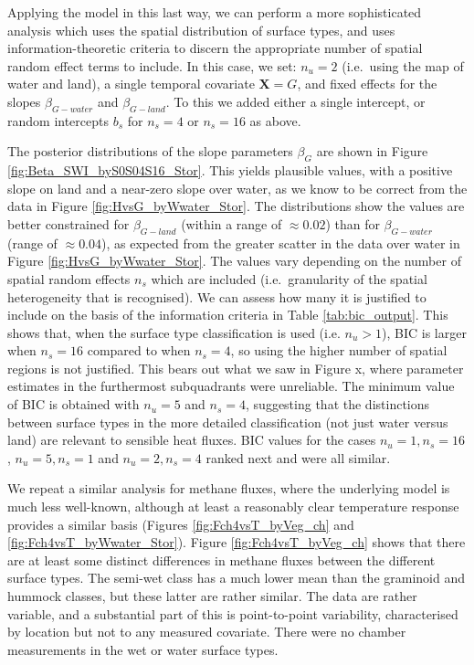 Applying the model in this last way, we can perform a more sophisticated
analysis which uses the spatial distribution of surface types, and uses
information-theoretic criteria to discern the appropriate number of
spatial random effect terms to include. In this case, we set:
\(n_u = 2\) (i.e.~using the map of water and land), a single temporal
covariate \(\mathbf{X} = G\), and fixed effects for the slopes
\(\beta_{G-water}\) and \(\beta_{G-land}\). To this we added either a
single intercept, or random intercepts \(b_s\) for \(n_s = 4\) or
\(n_s = 16\) as above.

The posterior distributions of the slope parameters \(\beta_{G}\) are
shown in Figure \ref{fig:Beta_SWI_byS0S04S16_Stor}. This yields
plausible values, with a positive slope on land and a near-zero slope
over water, as we know to be correct from the data in Figure
\ref{fig:HvsG_byWwater_Stor}. The distributions show the values are
better constrained for \(\beta_{G-land}\) (within a range of
\(\approx 0.02\)) than for \(\beta_{G-water}\) (range of
\(\approx 0.04\)), as expected from the greater scatter in the data over
water in Figure \ref{fig:HvsG_byWwater_Stor}. The values vary depending
on the number of spatial random effects \(n_s\) which are included
(i.e.~granularity of the spatial heterogeneity that is recognised). We
can assess how many it is justified to include on the basis of the
information criteria in Table \ref{tab:bic_output}. This shows that,
when the surface type classification is used (i.e. \(n_u > 1\)), BIC is
larger when \(n_s = 16\) compared to when \(n_s = 4\), so using the
higher number of spatial regions is not justified. This bears out what
we saw in Figure x, where parameter estimates in the furthermost
subquadrants were unreliable. The minimum value of BIC is obtained with
\(n_u = 5\) and \(n_s = 4\), suggesting that the distinctions between
surface types in the more detailed classification (not just water versus
land) are relevant to sensible heat fluxes. BIC values for the cases
\(n_u = 1, n_s = 16\), \(n_u = 5, n_s = 1\) and \(n_u = 2, n_s = 4\)
ranked next and were all similar.

We repeat a similar analysis for methane fluxes, where the underlying
model is much less well-known, although at least a reasonably clear
temperature response provides a similar basis (Figures
\ref{fig:Fch4vsT_byVeg_ch} and \ref{fig:Fch4vsT_byWwater_Stor}). Figure
\ref{fig:Fch4vsT_byVeg_ch} shows that there are at least some distinct
differences in methane fluxes between the different surface types. The
semi-wet class has a much lower mean than the graminoid and hummock
classes, but these latter are rather similar. The data are rather
variable, and a substantial part of this is point-to-point variability,
characterised by location but not to any measured covariate. There were
no chamber measurements in the wet or water surface types.

